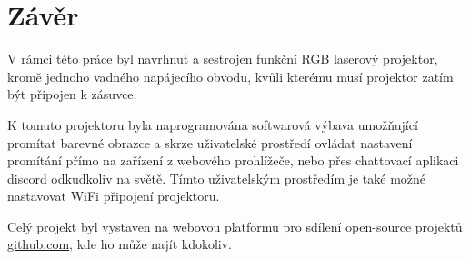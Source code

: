 \newpage
\chapter*{Závěr}

V rámci této práce byl navrhnut a sestrojen funkční RGB laserový projektor, kromě jednoho vadného napájecího obvodu, kvůli kterému musí projektor zatím být připojen k zásuvce.

K tomuto projektoru byla naprogramována softwarová výbava umožňující promítat barevné obrazce a skrze uživatelské prostředí ovládat nastavení promítání přímo na zařízení z webového prohlížeče, nebo přes chattovací aplikaci discord odkudkoliv na světě. Tímto uživatelským prostředím je také možné nastavovat WiFi připojení projektoru.

Celý projekt byl vystaven na webovou platformu pro sdílení open-source projektů \url{github.com}, kde ho může najít kdokoliv.

